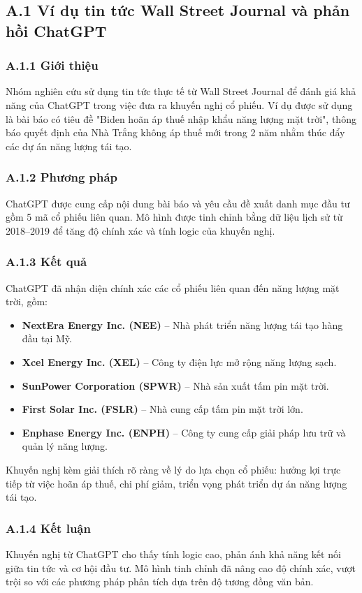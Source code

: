 \documentclass[a4paper,12pt]{article}
\begin{document}
\subsection*{A.1 Ví dụ tin tức Wall Street Journal và phản hồi ChatGPT}

\subsubsection*{A.1.1 Giới thiệu}
Nhóm nghiên cứu sử dụng tin tức thực tế từ Wall Street Journal để đánh giá khả năng của ChatGPT trong việc đưa ra khuyến nghị cổ phiếu. Ví dụ được sử dụng là bài báo có tiêu đề "Biden hoãn áp thuế nhập khẩu năng lượng mặt trời", thông báo quyết định của Nhà Trắng không áp thuế mới trong 2 năm nhằm thúc đẩy các dự án năng lượng tái tạo.

\subsubsection*{A.1.2 Phương pháp}
ChatGPT được cung cấp nội dung bài báo và yêu cầu đề xuất danh mục đầu tư gồm 5 mã cổ phiếu liên quan. Mô hình được tinh chỉnh bằng dữ liệu lịch sử từ 2018–2019 để tăng độ chính xác và tính logic của khuyến nghị.

\subsubsection*{A.1.3 Kết quả}
ChatGPT đã nhận diện chính xác các cổ phiếu liên quan đến năng lượng mặt trời, gồm:
\begin{itemize}
    \item \textbf{NextEra Energy Inc. (NEE)} – Nhà phát triển năng lượng tái tạo hàng đầu tại Mỹ.
    \item \textbf{Xcel Energy Inc. (XEL)} – Công ty điện lực mở rộng năng lượng sạch.
    \item \textbf{SunPower Corporation (SPWR)} – Nhà sản xuất tấm pin mặt trời.
    \item \textbf{First Solar Inc. (FSLR)} – Nhà cung cấp tấm pin mặt trời lớn.
    \item \textbf{Enphase Energy Inc. (ENPH)} – Công ty cung cấp giải pháp lưu trữ và quản lý năng lượng.
\end{itemize}
Khuyến nghị kèm giải thích rõ ràng về lý do lựa chọn cổ phiếu: hưởng lợi trực tiếp từ việc hoãn áp thuế, chi phí giảm, triển vọng phát triển dự án năng lượng tái tạo.

\subsubsection*{A.1.4 Kết luận}
Khuyến nghị từ ChatGPT cho thấy tính logic cao, phản ánh khả năng kết nối giữa tin tức và cơ hội đầu tư. Mô hình tinh chỉnh đã nâng cao độ chính xác, vượt trội so với các phương pháp phân tích dựa trên độ tương đồng văn bản.
\end{document}
